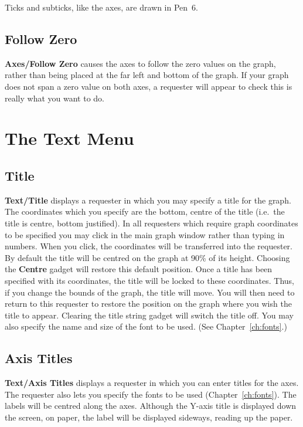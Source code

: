 Ticks and subticks, like the axes, are drawn in Pen~6.

\subsection{Follow Zero}
{\bf Axes/Follow Zero}  causes the axes to follow 
the zero values on the graph, rather than being placed at the far left and bottom 
of the graph. If your graph does not span a zero value on both axes, a requester 
will appear to check this is really what you want to do.


\section{The Text Menu}

\subsection{Title}
{\bf Text/Title}  displays a requester in which you may specify 
a title for the graph. 
The coordinates which you specify are the bottom, centre of the title (i.e.\ the 
title is centre, bottom justified). In all requesters which require graph coordinates
to be specified you may click in the main graph window rather than typing in numbers.
When you click, the coordinates will be transferred into the requester.
By default the title will be centred on the 
graph at 90\% of its height. Choosing the {\bf Centre} gadget will restore this 
default position. Once a title has been specified with its coordinates, the title 
will be locked to these coordinates. Thus, if you change the bounds of the graph, 
the title will move. You will then need to return to this requester to restore 
the position on the graph where you wish the title to appear. Clearing the title 
string gadget will switch the title off. You may also specify the name and size
of the font to be used. (See Chapter~\ref{ch:fonts}.)


\subsection{Axis Titles}
{\bf Text/Axis Titles}  displays a requester in which you can 
enter titles for the axes. The requester also lets you specify the fonts to be used
(Chapter~\ref{ch:fonts}).
The labels will be centred along the axes. Although the Y-axis title is displayed 
down the screen, on paper, the label will be displayed sideways, reading up the paper.


